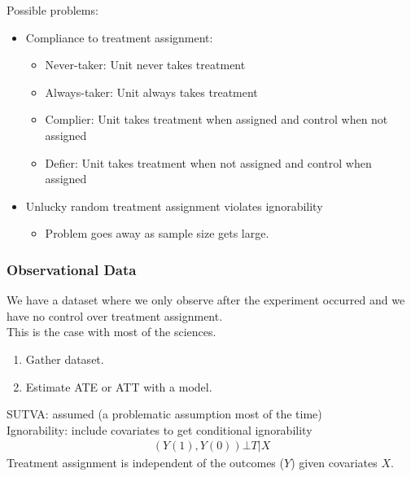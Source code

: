 \documentclass[handout]{beamer}
\begin{document}
\begin{frame}
Possible problems:
\pause
\bigskip
\begin{itemize}
\item Compliance to treatment assignment:
\pause
\begin{itemize}
\item Never-taker: Unit never takes treatment
\pause
\item Always-taker: Unit always takes treatment
\pause
\item Complier: Unit takes treatment when assigned and control when
not assigned
\pause
\item Defier: Unit takes treatment when not assigned and control when assigned
\end{itemize}
\pause
\bigskip
\item Unlucky random treatment assignment violates ignorability
\pause
\begin{itemize}
\item Problem goes away as sample size gets large.
\end{itemize}
\end{itemize}
\end{frame}

\begin{frame}
\frametitle{Observational Data}
\pause
We have a dataset where we only observe after the experiment occurred
and we have no control over treatment assignment. \\
\pause
\bigskip
This is the case with most of the sciences.
\pause
\bigskip
\begin{enumerate}
\item Gather dataset.
\pause
\item Estimate ATE or ATT with a model.
\end{enumerate}
\pause
\bigskip
SUTVA: assumed (a problematic assumption most of the time) \\
\pause
\bigskip
Ignorability: include covariates to get
conditional ignorability
\pause
\begin{eqnarray*}
(Y(1), Y(0)) \bot T | X
\end{eqnarray*}
\pause
Treatment assignment is independent of the outcomes ($Y$) given
covariates $X$.
\end{frame}
\end{document}
